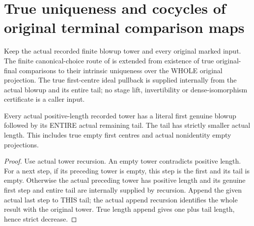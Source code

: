 \section{True uniqueness and cocycles of original terminal comparison maps}

Keep the actual recorded finite blowup tower and every original marked input.
The finite canonical-choice route of
\cite{wlodarczyk05-hironaka,bierstone-milman08-functoriality} is extended
from existence of true original-final comparisons to their intrinsic
uniqueness over the WHOLE original projection. The true first-centre ideal
pullback is supplied internally from the actual blowup and its entire tail;
no stage lift, invertibility or dense-isomorphism certificate is a caller input.

\begin{lemma}
\label{hir:original-actual-first-step-whole-tail-factorization}
\leanok
Every actual positive-length recorded tower has a literal first genuine
blowup followed by its ENTIRE actual remaining tail. The tail has strictly
smaller actual length. This includes true empty first centres and actual
nonidentity empty projections.
\end{lemma}
\begin{proof}
Use actual tower recursion. An empty tower contradicts positive length.
For a next step, if its preceding tower is empty, this step is the first
and its tail is empty. Otherwise the actual preceding tower has positive
length and its genuine first step and entire tail are internally supplied
by recursion. Append the given actual last step to THIS tail; the actual
append recursion identifies the whole result with the original tower.
True length append gives one plus tail length, hence strict decrease.
\end{proof}

